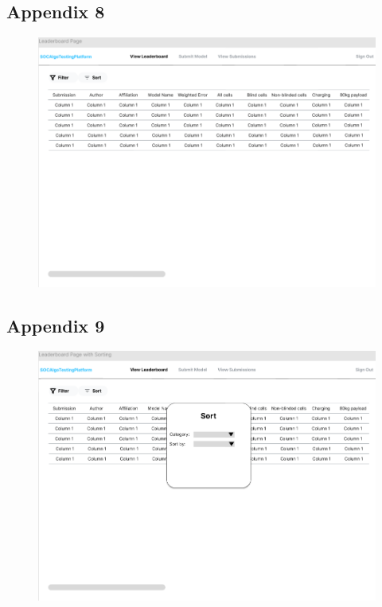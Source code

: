 \documentclass[12pt, titlepage]{article}
\begin{document}
\subsection{Appendix 8} \label{Appendix 8}
\begin{figure}[H]
    \centering
    \includegraphics[width=1\linewidth]{Design/SoftArchitecture/Interface/Leaderboard.png}
\end{figure}
\subsection{Appendix 9} \label{Appendix 9}
\begin{figure}[H]
    \centering
    \includegraphics[width=1\linewidth]{Design/SoftArchitecture/Interface/Sorting.png}
\end{figure}
\end{document}
